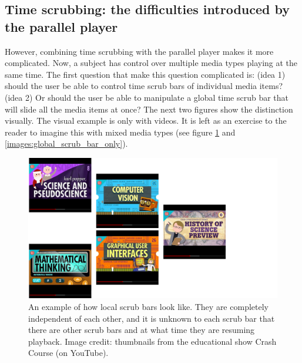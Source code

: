 

\subsection{Time scrubbing: the difficulties introduced by the parallel player}
However, combining time scrubbing with the parallel player makes it more complicated. Now, a subject has control over multiple media types playing at the same time. The first question that make this question complicated is: (idea 1) should the user be able to control time scrub bars of individual media items? (idea 2) Or should the user be able to manipulate a global time scrub bar that will slide all the media items at once? The next two figures show the distinction visually. The visual example is only with videos. It is left as an exercise to the reader to imagine this with mixed media types (see figure \ref{images:local_scrub_bars} and \ref{images:global_scrub_bar_only}). 

\begin{figure}
\centering
\includegraphics[width=1.35\textwidth, center]{images/local_scrub_bars.png} %
\caption{An example of how local scrub bars look like. They are completely independent of each other, and it is unknown to each scrub bar that there are other scrub bars and at what time they are resuming playback. Image credit: thumbnails from the educational show Crash Course (on YouTube).}
\label{images:local_scrub_bars}
\end{figure}

